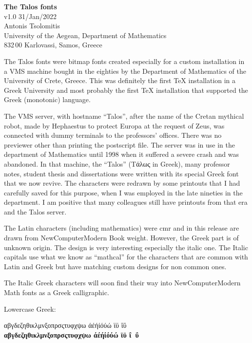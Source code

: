 \documentclass[a4paper]{article}
\begin{document}
\begin{center}
  \textbf{\Large The Talos fonts}\\
v1.0 31/Jan/2022\\[1ex]
Antonis Tsolomitis\\
University of the Aegean,
  Department of Mathematics\\
  832\,00 Karlovassi, Samos, Greece
\end{center}

The Talos fonts were bitmap fonts created especially for
a custom installation in a VMS machine bought in the eighties
by the Department of Mathematics of the University of Crete, Greece.
This was definitely the first TeX installation in a Greek University
and most probably the first TeX installation that supported the Greek
(monotonic) language.

The VMS server, with hostname ``Talos'', after the name of the Cretan mythical
robot, made by Hephaestus to protect Europa at the request of Zeus,
was connected with dummy terminals to the professors' offices. There was no
previewer other than printing the postscript file.
The server was in use in the department of Mathematics until \textsc{1998}
when it suffered a severe crash and was abandoned. In that machine,
the ``Talos'' (Τάλως in Greek), many professor notes, student thesis and
dissertations were written
with its special Greek font that we now revive. The characters were redrawn
by some printouts that I had carefully saved for this purpose, when I was
employed in the late nineties in the department. I am positive that
many colleagues still have printouts from that era and the Talos server.

The Latin characters (including mathematics) were cmr and in this release
are drawn from NewComputerModern Book weight. However, the Greek part
is of unknown origin. The design is very interesting especially the italic one.
The Italic capitals use what we know as ``mathcal'' for the characters
that are common with Latin and Greek but have matching custom designs
for non common ones.

The Italic Greek characters will soon find their way into NewComputerModern Math fonts as
a Greek calligraphic.

Lowercase Greek:
\begin{center}
  αβγδεζηθικλμνξοπρσςτυφχψω άέήίόύώ ϊϋ ΐΰ\\
  \textbf{αβγδεζηθικλμνξοπρσςτυφχψω άέήίόύώ ϊϋ ΐ\ ΰ}
\end{center}
\end{document}
